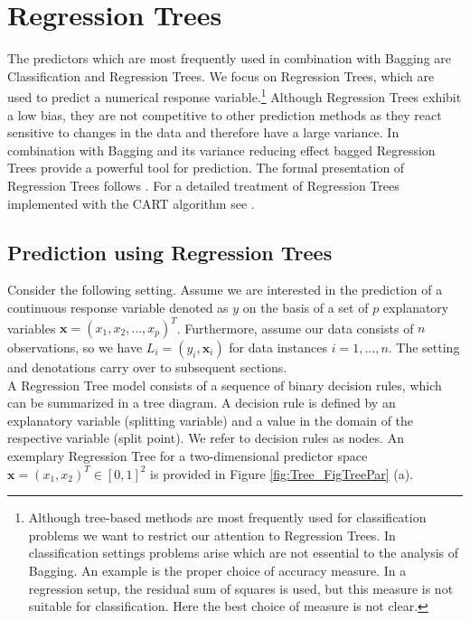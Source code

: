 \section{Regression Trees}
The predictors which are most frequently used in combination with Bagging are Classification and Regression Trees. We focus on Regression Trees, which are used to predict a numerical response variable.\footnote{Although tree-based methods are most frequently used for classification problems we want to restrict our attention to Regression Trees. In classification settings problems arise which are not essential to the analysis of Bagging. An example is the proper choice of accuracy  measure. In a regression setup, the residual sum of squares is used, but this measure is not suitable for classification. Here the best choice of measure is not clear.} Although Regression Trees exhibit a low bias, they are not competitive to other prediction methods as they react sensitive to changes in the data and therefore have a large variance. In combination with Bagging and its variance reducing effect bagged Regression Trees provide a powerful tool for prediction. The formal presentation of Regression Trees follows \cite{EoSL}. For a detailed treatment of Regression Trees implemented with the CART algorithm see \cite{Breiman1984}.

\noindent
\subsection{Prediction using Regression Trees}\label{sec:Tree_Pred}
Consider the following setting. Assume we are interested in the prediction of a continuous response variable denoted as $y$ on the basis of a set of $p$ explanatory variables $\mathbf{x}=(x_1,x_2,...,x_p)^T$. Furthermore, assume our data consists of $n$ observations, so we have $L_i = (y_i,\mathbf{x}_i)$ for data instances $i=1,...,n$. The setting and denotations carry over to subsequent sections.\\
A Regression Tree model consists of a sequence of binary decision rules, which can be summarized in a tree diagram. A decision rule is defined by an explanatory variable (splitting variable) and a value in the domain of the respective variable (split point). We refer to decision rules as nodes. An exemplary Regression Tree for a two-dimensional predictor space $\mathbf{x}=(x_1,x_2)^T \in [0,1]^2$ is provided in Figure \ref{fig:Tree_FigTreePar} (a).



